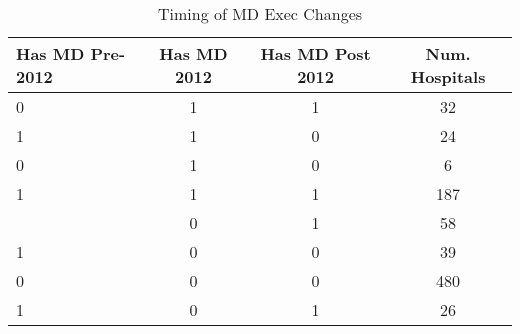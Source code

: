 \begin{table}[ht!]
\centering
\caption{\label{tab:change_timing}Timing of MD Exec Changes}
\centering
\begin{tabular}[t]{lccc}
\toprule
Has MD Pre-2012 & Has MD 2012 & Has MD Post 2012 & Num. Hospitals\\
\midrule
0 & 1 & 1 & 32\\
1 & 1 & 0 & 24\\
0 & 1 & 0 & 6\\
1 & 1 & 1 & 187\\
\addlinespace
0 & 0 & 1 & 58\\
1 & 0 & 0 & 39\\
0 & 0 & 0 & 480\\
1 & 0 & 1 & 26\\
\bottomrule
\end{tabular}
\end{table}
